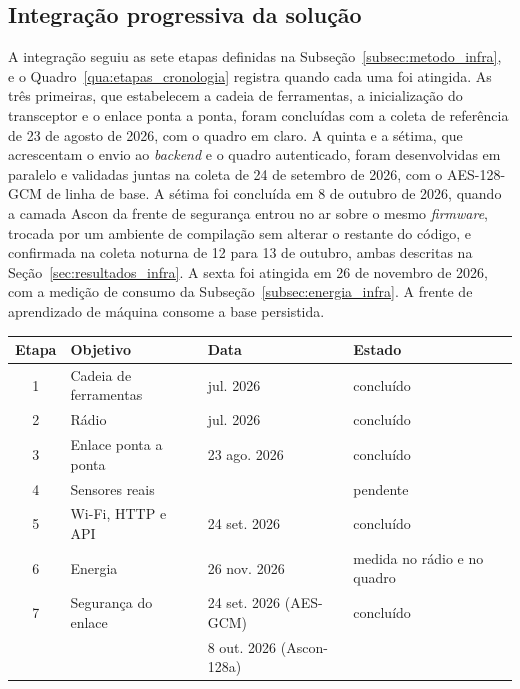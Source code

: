\subsection{Integração progressiva da solução}

A integração seguiu as sete etapas definidas na Subseção~\ref{subsec:metodo_infra}, e o Quadro~\ref{qua:etapas_cronologia} registra quando cada uma foi atingida. As três primeiras, que estabelecem a cadeia de ferramentas, a inicialização do transceptor e o enlace ponta a ponta, foram concluídas com a coleta de referência de 23 de agosto de 2026, com o quadro em claro. A quinta e a sétima, que acrescentam o envio ao \textit{backend} e o quadro autenticado, foram desenvolvidas em paralelo e validadas juntas na coleta de 24 de setembro de 2026, com o AES-128-GCM de linha de base. A sétima foi concluída em 8 de outubro de 2026, quando a camada Ascon da frente de segurança entrou no ar sobre o mesmo \textit{firmware}, trocada por um ambiente de compilação sem alterar o restante do código, e confirmada na coleta noturna de 12 para 13 de outubro, ambas descritas na Seção~\ref{sec:resultados_infra}. A sexta foi atingida em 26 de novembro de 2026, com a medição de consumo da Subseção~\ref{subsec:energia_infra}. A frente de aprendizado de máquina consome a base persistida.

\begin{quadro}[htb]
\centering
\caption{Cronologia das etapas de construção da infraestrutura}
\label{qua:etapas_cronologia}
\small
\begin{tabular}{clll}
\hline
\textbf{Etapa} & \textbf{Objetivo} & \textbf{Data} & \textbf{Estado} \\
\hline
1 & Cadeia de ferramentas & jul. 2026 & concluído \\
2 & Rádio & jul. 2026 & concluído \\
3 & Enlace ponta a ponta & 23 ago. 2026 & concluído \\
4 & Sensores reais & & pendente \\
5 & Wi-Fi, HTTP e API & 24 set. 2026 & concluído \\
6 & Energia & 26 nov. 2026 & medida no rádio e no quadro \\
7 & Segurança do enlace & 24 set. 2026 (AES-GCM) & concluído \\
  &                     & 8 out. 2026 (Ascon-128a) & \\
\hline
\end{tabular}
\end{quadro}

